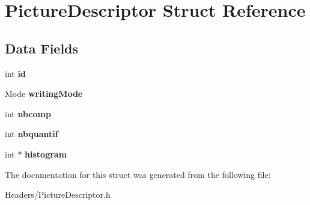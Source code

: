 \hypertarget{structPictureDescriptor}{\section{Picture\-Descriptor Struct Reference}
\label{structPictureDescriptor}
}
\subsection*{Data Fields}
\begin{DoxyCompactItemize}
\item 
\hypertarget{structPictureDescriptor_a51b26bd524a9c93ac299558f1304441b}{int {\bfseries id}}\label{structPictureDescriptor_a51b26bd524a9c93ac299558f1304441b}

\item 
\hypertarget{structPictureDescriptor_ad93bc0a7b6c9c2c8ef9bc0e6f9a5460b}{Mode {\bfseries writing\-Mode}}\label{structPictureDescriptor_ad93bc0a7b6c9c2c8ef9bc0e6f9a5460b}

\item 
\hypertarget{structPictureDescriptor_a54bbb676f6cb4f657637df728166ed48}{int {\bfseries nbcomp}}\label{structPictureDescriptor_a54bbb676f6cb4f657637df728166ed48}

\item 
\hypertarget{structPictureDescriptor_aab550d2377c85f246fc0eaec4fec5b24}{int {\bfseries nbquantif}}\label{structPictureDescriptor_aab550d2377c85f246fc0eaec4fec5b24}

\item 
\hypertarget{structPictureDescriptor_aee6bf8052898ad69a823d6f7704d2832}{int $\ast$ {\bfseries histogram}}\label{structPictureDescriptor_aee6bf8052898ad69a823d6f7704d2832}

\end{DoxyCompactItemize}


The documentation for this struct was generated from the following file\-:\begin{DoxyCompactItemize}
\item 
Headers/Picture\-Descriptor.\-h\end{DoxyCompactItemize}
